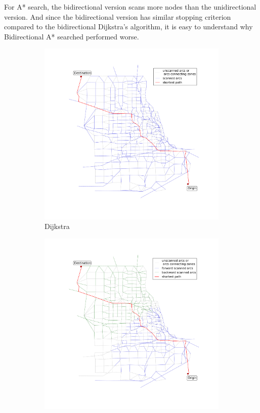 For A* search,
the bidirectional version scans more nodes than the unidirectional version.
And since the bidirectional version has similar stopping criterion compared to the bidirectional Dijkstra's algorithm,
it is easy to understand why Bidirectional A* searched performed worse.

\begin{figure}
    \centering
    \begin{subfigure}{.5\textwidth}
        \centering
        \includegraphics[width=\textwidth,trim=120px 120px 48px 120px,clip]{img/chicago_dijkstra}
        \caption{Dijkstra}
        \label{fig:chicago_dijkstra}
    \end{subfigure}%
    \begin{subfigure}{.5\textwidth}
        \centering
        \includegraphics[width=\textwidth,trim=120px 120px 48px 120px,clip]{img/chicago_bidirect}

\end{subfigure}
\end{figure}
